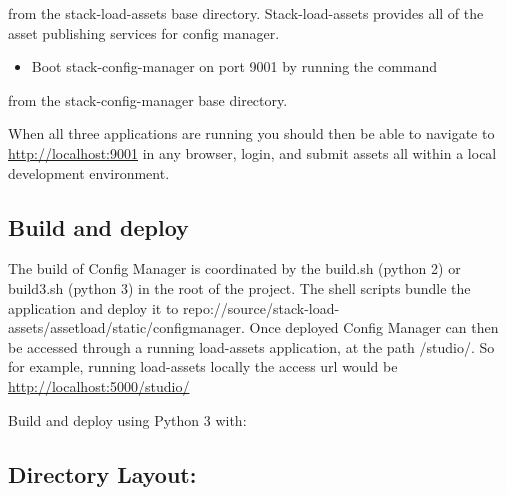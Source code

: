 from the stack-load-assets base directory. Stack-load-assets provides
all of the asset publishing services for config manager.

\begin{itemize}
\tightlist
\item
  Boot stack-config-manager on port 9001 by running the command
\end{itemize}

\begin{Shaded}
\begin{Highlighting}[]
\end{Highlighting}
\end{Shaded}

from the stack-config-manager base directory.

When all three applications are running you should then be able to
navigate to \href{http://localhost:9001}{http://localhost:9001} in any
browser, login, and submit assets all within a local development
environment.

\hypertarget{build-and-deploy}{%
\subsection{Build and deploy}\label{build-and-deploy}}

The build of Config Manager is coordinated by the build.sh (python 2) or
build3.sh (python 3) in the root of the project. The shell scripts
bundle the application and deploy it to
repo://source/stack-load-assets/assetload/static/configmanager. Once
deployed Config Manager can then be accessed through a running
load-assets application, at the path /studio/. So for example, running
load-assets locally the access url would be
\href{http://localhost:5000/studio/}{http://localhost:5000/studio/}

Build and deploy using Python 3 with:

\begin{Shaded}
\begin{Highlighting}[]
\end{Highlighting}
\end{Shaded}

\hypertarget{directory-layout}{%
\subsection{Directory Layout:}\label{directory-layout}}

